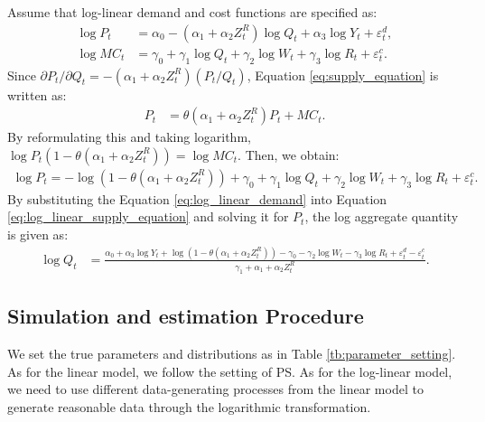 \documentclass[11pt, a4paper]{article}
\begin{document}
Assume that log-linear demand and cost functions are specified as:
\begin{align}
    \log P_{t} &= \alpha_0 - (\alpha_1 + \alpha_2 Z^{R}_{t}) \log Q_t + \alpha_3 \log Y_t + \varepsilon^{d}_{t},\label{eq:log_linear_demand}\\
    \log MC_t &= \gamma_0 + \gamma_1 \log Q_t +  \gamma_2 \log W_{t} + \gamma_3 \log R_t + \varepsilon^{c}_{t}.\label{eq:log_linear_marginal_cost}
\end{align}
Since $\partial P_t/\partial Q_t = - (\alpha_1 + \alpha_2 Z_{t}^R) (P_t/Q_t) $, Equation \eqref{eq:supply_equation} is written as:
\begin{align*}
    P_t &= \theta (\alpha_1 + \alpha_2 Z^{R}_{t}) P_t + MC_t.
\end{align*}
By reformulating this and taking logarithm, $\log P_t(1 -\theta (\alpha_1 + \alpha_2 Z^{R}_{t})) = \log MC_t.$
Then, we obtain:
\begin{align}
    \log P_t = - \log(1 - \theta(\alpha_1 + \alpha_2 Z^{R}_{t})) + \gamma_0 + \gamma_1 \log Q_t +  \gamma_2 \log W_{t} + \gamma_3 \log R_t + \varepsilon^{c}_{t}. \label{eq:log_linear_supply_equation}
\end{align}
By substituting the Equation \eqref{eq:log_linear_demand} into Equation \eqref{eq:log_linear_supply_equation} and solving it for $P_{t}$, the log aggregate quantity is given as: 
\begin{align}
    \log Q_t &= \frac{ \alpha_0 + \alpha_3 \log Y_t + \log (1 - \theta (\alpha_1 + \alpha_2 Z^{R}_{t})) - \gamma_0  -  \gamma_2 \log W_{t} - \gamma_3 \log R_t + \varepsilon^{d}_{t} - \varepsilon^{c}_{t}}{\gamma_1+ \alpha_1 + \alpha_2 Z^{R}_{t} }.\label{eq:quantity_loglinear}
\end{align}


\subsection{Simulation and estimation Procedure}

We set the true parameters and distributions as in Table \ref{tb:parameter_setting}. 
As for the linear model, we follow the setting of PS.
As for the log-linear model, we need to use different data-generating processes from the linear model to generate reasonable data through the logarithmic transformation. 
\end{document}
